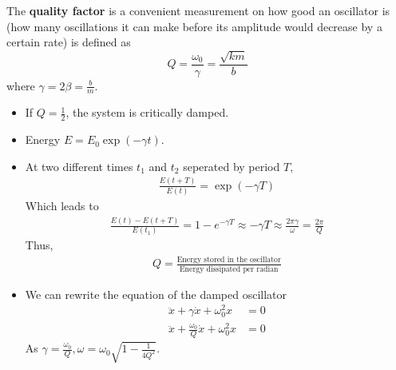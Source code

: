 \documentclass[a4paper]{article}
\numberwithin{equation}{section}
\begin{document}
\begin{definition}
    The \textbf{quality factor} is a convenient measurement on how good an oscillator is (how many oscillations it can make before its amplitude would decrease by a certain rate) is defined as 
    \begin{equation}
        Q=\frac{\omega_0}{\gamma}=\frac{\sqrt{km}}{b}
    \end{equation}
    where $\gamma=2\beta=\frac{b}{m}$.
\end{definition}
\begin{itemize}
    \item If $Q=\frac{1}{2}$, the system is critically damped.
    \item Energy $E=E_0\exp(-\gamma t)$.
    \item At two different times $t_1$ and $t_2$ seperated by period $T$, 
    \begin{align}
        \frac{E(t+T)}{E(t)}=\exp(-\gamma T)
    \end{align}
    Which leads to
    \begin{align}
        \frac{E(t)-E(t+T)}{E(t_1)}=1-e^{-\gamma T}\approx -\gamma T\approx\frac{2\pi\gamma}{\omega}=\frac{2\pi}{Q}
    \end{align}
    Thus,
    \begin{align}
        Q=\frac{\text{Energy stored in the oscillator}}{\text{Energy dissipated per radian}}
    \end{align}
    \item We can rewrite the equation of the damped oscillator
    \begin{align}
        \ddot x+\gamma\dot x+\omega_0^2 x&=0\\
        \ddot x+\frac{\omega_0}{Q}\dot x+\omega_0^2 x&=0
    \end{align}
    As $\displaystyle{\gamma=\frac{\omega_0}{Q}, \omega=\omega_0\sqrt{1-\frac{1}{4Q^2}}}$.
    \begin{center}
    \end{center}
\end{itemize}
\end{document}
